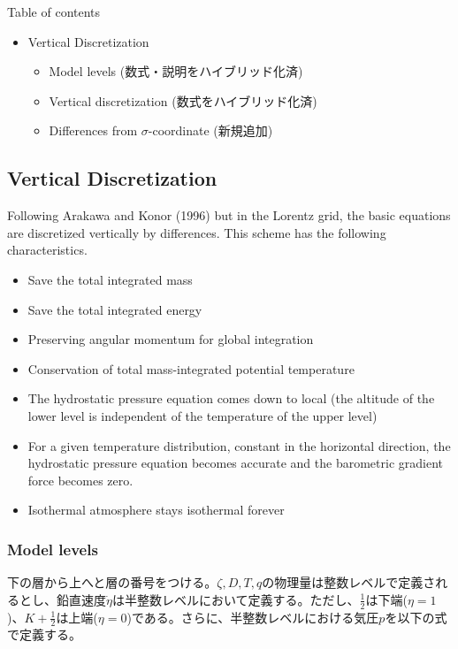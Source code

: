 Table of contents

\begin{itemize}
\tightlist
\item
  Vertical Discretization

  \begin{itemize}
  \tightlist
  \item
    Model levels (数式・説明をハイブリッド化済)
  \item
    Vertical discretization (数式をハイブリッド化済)
  \item
    Differences from \(\sigma\)-coordinate (新規追加)
  \end{itemize}
\end{itemize}

\hypertarget{vertical-discretization}{%
\subsection{Vertical Discretization}\label{vertical-discretization}}

Following Arakawa and Konor (1996) but in the Lorentz grid, the basic
equations are discretized vertically by differences. This scheme has the
following characteristics.

\begin{itemize}
\item
  Save the total integrated mass
\item
  Save the total integrated energy
\item
  Preserving angular momentum for global integration
\item
  Conservation of total mass-integrated potential temperature
\item
  The hydrostatic pressure equation comes down to local (the altitude of
  the lower level is independent of the temperature of the upper level)
\item
  For a given temperature distribution, constant in the horizontal
  direction, the hydrostatic pressure equation becomes accurate and the
  barometric gradient force becomes zero.
\item
  Isothermal atmosphere stays isothermal forever
\end{itemize}

\hypertarget{model-levels}{%
\subsubsection{Model levels}\label{model-levels}}

下の層から上へと層の番号をつける。\(\zeta,D,T,q\)の物理量は整数レベルで定義されるとし、鉛直速度\(\dot{\eta}\)は半整数レベルにおいて定義する。ただし、\(\frac{1}{2}\)は下端(\(\eta=1\))、\(K+\frac{1}{2}\)は上端(\(\eta=0\))である。さらに、半整数レベルにおける気圧\(p\)を以下の式で定義する。

